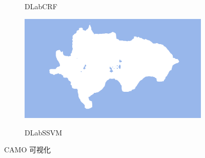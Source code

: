 \documentclass[a4paper,12pt]{ctexart}
\begin{document}
\begin{figure}[h]
\begin{subfigure}{0.25\textwidth}
        \label{fig:demo1_crf}
        \caption{DLabCRF}
    \end{subfigure}%
    \hfill
    \begin{subfigure}{0.25\textwidth}
        \centering
        \includegraphics[width=\linewidth]{figures/CAMO_demo1/CAMO_demo1_pred_dlap.png}
        \label{fig:demo1_ssvm}
        \caption{DLabSSVM}
    \end{subfigure}

    \caption{CAMO 可视化 \label{fig:CAMO_demo1}}
\end{figure}
\end{document}
